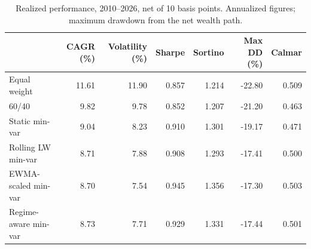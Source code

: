 \begin{table}[htbp]
\caption{Realized performance, 2010--2026, net of 10 basis points. Annualized figures; maximum drawdown from the net wealth path.}
\label{tab:table1_performance}
\small
\begin{tabular}{lrrrrrr}
\toprule
 & CAGR (\%) & Volatility (\%) & Sharpe & Sortino & Max DD (\%) & Calmar \\
\midrule
Equal weight & 11.61 & 11.90 & 0.857 & 1.214 & -22.80 & 0.509 \\
60/40 & 9.82 & 9.78 & 0.852 & 1.207 & -21.20 & 0.463 \\
Static min-var & 9.04 & 8.23 & 0.910 & 1.301 & -19.17 & 0.471 \\
Rolling LW min-var & 8.71 & 7.88 & 0.908 & 1.293 & -17.41 & 0.500 \\
EWMA-scaled min-var & 8.70 & 7.54 & 0.945 & 1.356 & -17.30 & 0.503 \\
Regime-aware min-var & 8.73 & 7.71 & 0.929 & 1.331 & -17.44 & 0.501 \\
\bottomrule
\end{tabular}
\end{table}
